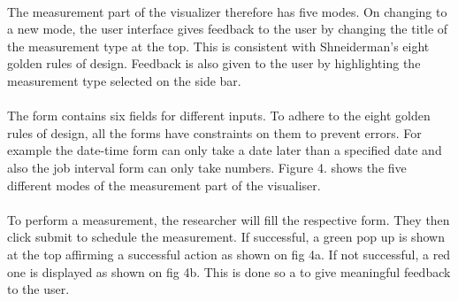 \paragraph{}
The measurement part of the visualizer therefore has five modes. On changing to a new mode, the user interface gives feedback to the user by changing the title of the measurement type at the top. This is consistent with Shneiderman's eight golden rules of design\cite{Shneiderman:2016:DUI:3033040}. Feedback is also given to the user by highlighting the measurement type selected on the side bar. 
\paragraph{}
The form contains six fields for different inputs. To adhere to the eight golden rules of design, all the forms have constraints on them to prevent errors. For example the date-time form can only take a date later than a specified date and also the job interval form can only take numbers\cite{Shneiderman:2016:DUI:3033040}. Figure 4. shows the five different modes of the measurement part of the visualiser. 
\paragraph{}
To perform a measurement, the researcher will fill the respective form. They then click submit to schedule the measurement. If successful, a green pop up is shown at the top affirming a successful action as shown on fig 4a. If not successful, a red one is displayed as shown on fig 4b. This is done so a to give meaningful feedback to the user\cite{Shneiderman:2016:DUI:3033040}.


